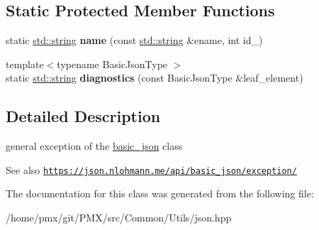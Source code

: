 \subsection*{Static Protected Member Functions}
\begin{DoxyCompactItemize}
\item 
\mbox{\label{classnlohmann_1_1detail_1_1exception_abf41a7e9178356314082284e6cfea278}} 
static \hyperlink{namespacenlohmann_1_1detail_a1ed8fc6239da25abcaf681d30ace4985ab45cffe084dd3d20d928bee85e7b0f21}{std\+::string} {\bfseries name} (const \hyperlink{namespacenlohmann_1_1detail_a1ed8fc6239da25abcaf681d30ace4985ab45cffe084dd3d20d928bee85e7b0f21}{std\+::string} \&ename, int id\+\_\+)
\item 
\mbox{\label{classnlohmann_1_1detail_1_1exception_aa353a7dba4fd179f7224b8a2a238a264}} 
{\footnotesize template$<$typename Basic\+Json\+Type $>$ }\\static \hyperlink{namespacenlohmann_1_1detail_a1ed8fc6239da25abcaf681d30ace4985ab45cffe084dd3d20d928bee85e7b0f21}{std\+::string} {\bfseries diagnostics} (const Basic\+Json\+Type \&leaf\+\_\+element)
\end{DoxyCompactItemize}


\subsection{Detailed Description}
general exception of the \hyperlink{classnlohmann_1_1basic__json}{basic\+\_\+json} class 

\begin{DoxySeeAlso}{See also}
\href{https://json.nlohmann.me/api/basic_json/exception/}{\tt https\+://json.\+nlohmann.\+me/api/basic\+\_\+json/exception/} 
\end{DoxySeeAlso}


The documentation for this class was generated from the following file\+:\begin{DoxyCompactItemize}
\item 
/home/pmx/git/\+P\+M\+X/src/\+Common/\+Utils/json.\+hpp\end{DoxyCompactItemize}
